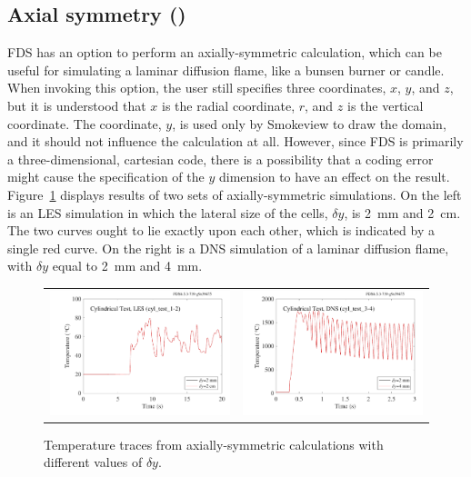 \documentclass[11pt]{book}
\begin{document}
\subsection{Axial symmetry (\texorpdfstring{}{cyl\_test})}

FDS has an option to perform an axially-symmetric calculation, which can be useful for simulating a laminar diffusion flame, like a bunsen burner or candle. When invoking this option, the user still specifies three coordinates, $x$, $y$, and $z$, but it is understood that $x$ is the radial coordinate, $r$, and $z$ is the vertical coordinate. The coordinate, $y$, is used only by Smokeview to draw the domain, and it should not influence the calculation at all. However, since FDS is primarily a three-dimensional, cartesian code, there is a possibility that a coding error might cause the specification of the $y$ dimension to have an effect on the result. Figure~\ref{cyl_test} displays results of two sets of axially-symmetric simulations. On the left is an LES simulation in which the lateral size of the cells, $\delta y$, is 2~mm and 2~cm. The two curves ought to lie exactly upon each other, which is indicated by a single red curve. On the right is a DNS simulation of a laminar diffusion flame, with $\delta y$ equal to 2~mm and 4~mm.
\begin{figure}[h!]
\begin{tabular*}{\textwidth}{lr}
\includegraphics[width=3.2in]{SCRIPT_FIGURES/cyl_test} &
\includegraphics[width=3.2in]{SCRIPT_FIGURES/cyl_test_3-4}
\end{tabular*}
\caption[The  test cases]{Temperature traces from axially-symmetric calculations with different values of $\delta y$.}
\label{cyl_test}
\end{figure}
\end{document}
